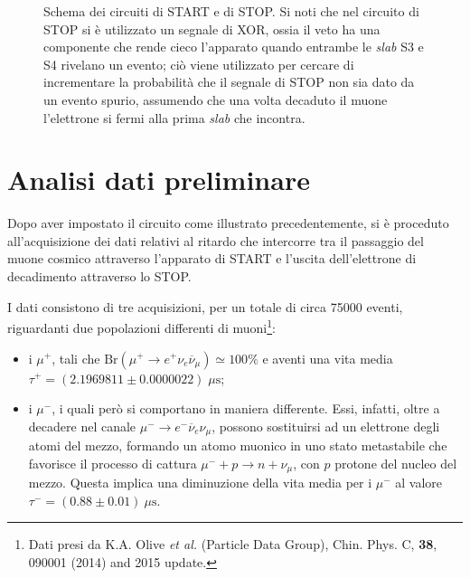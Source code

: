\documentclass[10pt, oneside, a4paper]{article}   	%
\begin{document}
\begin{figure}[H]
	\centering
	
	\caption{Schema dei circuiti di START e di STOP. Si noti che nel circuito di STOP si è utilizzato un segnale di XOR, ossia il veto ha una componente che rende cieco l'apparato quando entrambe le \emph{slab} S3 e S4 rivelano un evento; ciò viene utilizzato per cercare di incrementare la probabilità che il segnale di STOP non sia dato da un evento spurio, assumendo che una volta decaduto il muone l'elettrone si fermi alla prima \emph{slab} che incontra.}
	\label{scemi}
\end{figure}

\section{Analisi dati preliminare}
Dopo aver impostato il circuito come illustrato precedentemente, si è proceduto all'acquisizione dei dati relativi al ritardo che intercorre tra il passaggio del muone cosmico attraverso l'apparato di START e l'uscita dell'elettrone di decadimento attraverso lo STOP.

I dati consistono di tre acquisizioni, per un totale di circa 75000 eventi, riguardanti due popolazioni differenti di muoni\footnote{Dati presi da K.A. Olive \emph{et al.} (Particle Data Group), Chin. Phys. C, \textbf{38}, 090001 (2014) and 2015 update.}:
\begin{itemize}
	\item i $\mu^+$, tali che $\mbox{Br}(\mu^+ \to e^+\nu_e\overline{\nu}_\mu)\simeq 100 \%$ e aventi una vita media \linebreak $\tau^+=(2.1969811 \pm 0.0000022)\;\mu\mbox{s}$;
\item i $\mu^-$, i quali però si comportano in maniera differente. Essi, infatti, oltre a decadere nel canale $\mu^-\to e^-\overline{\nu}_e\nu_\mu$, possono sostituirsi ad un elettrone degli atomi del mezzo, formando un atomo muonico in uno stato metastabile che favorisce il processo di cattura $\mu^-+p\to n+\nu_\mu $, con $p$ protone del nucleo del mezzo. Questa implica una diminuzione della vita media per i $\mu^-$ al valore $\tau^-=(0.88 \pm 0.01) \ \mu \mbox{s}$.
\end{itemize}
\end{document}
